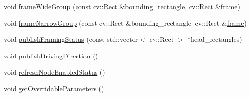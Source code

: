\begin{DoxyCompactItemize}
\item 
void \hyperlink{class_r_p_framing_node_af30fa6293069c2f2748702920c92c885}{frame\-Wide\-Group} (const cv\-::\-Rect \&bounding\-\_\-rectangle, cv\-::\-Rect \&\hyperlink{class_r_p_framing_node_a1e4cba34d01b81db86ae54435d98ec76}{frame})
\item 
void \hyperlink{class_r_p_framing_node_a0f8ddf2c1893f4bcc36414948a179a83}{frame\-Narrow\-Group} (const cv\-::\-Rect \&bounding\-\_\-rectangle, cv\-::\-Rect \&\hyperlink{class_r_p_framing_node_a1e4cba34d01b81db86ae54435d98ec76}{frame})
\item 
void \hyperlink{class_r_p_framing_node_a77640fd8d50fd4b075e8ef3be2e8e7bd}{publish\-Framing\-Status} (const std\-::vector$<$ cv\-::\-Rect $>$ $\ast$head\-\_\-rectangles)
\item 
void \hyperlink{class_r_p_framing_node_ae09715b4156667c15f5ca9123f77865a}{publish\-Driving\-Direction} ()
\item 
void \hyperlink{class_r_p_framing_node_aeb153d1d84d2698669375139b9277ead}{refresh\-Node\-Enabled\-Status} ()
\item 
void \hyperlink{class_r_p_framing_node_a666e1534a89c6096a5539f95efc49dd1}{get\-Overridable\-Parameters} ()
\end{DoxyCompactItemize}
